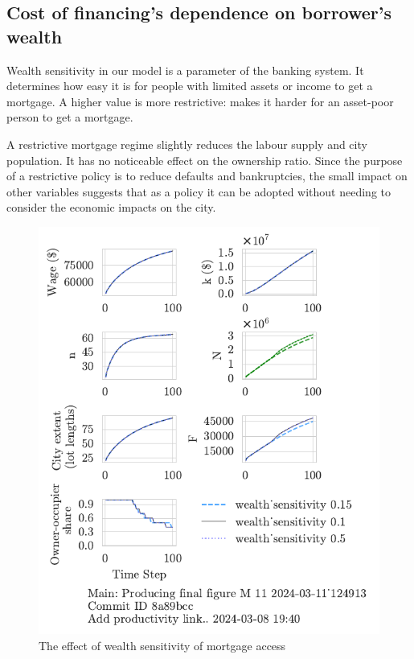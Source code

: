 \newpage
\subsection{Cost of financing's dependence on borrower's wealth}
Wealth sensitivity in our model is a parameter of the banking system. It determines how easy it is for people with limited assets or income to get a mortgage. A higher value is more restrictive:  makes it harder for an asset-poor person to get a mortgage.

A restrictive mortgage regime slightly reduces the labour supply and city population. It has no noticeable effect on the ownership ratio. Since the purpose of a restrictive policy is to reduce defaults and bankruptcies, the small impact on other variables suggests that as a policy it can be adopted without needing to consider the economic impacts on the city. 

\begin{figure}[h!bt]
    \centering
    \includegraphics[scale=1, trim={0 1.4cm 0 0},clip]{fig/wealth_sensitivity-124913.pdf}
    \caption{The effect of wealth sensitivity of mortgage access}
    \label{fig:wealth_sensitivity_ownership_trajectory}
\end{figure}

